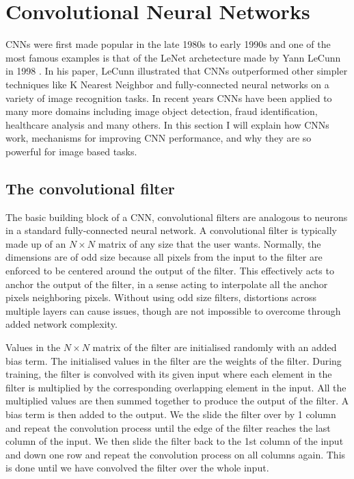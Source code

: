 \section{Convolutional Neural Networks}

\ac{CNN}s were first made popular in the late 1980s to early 1990s 
and one of the most famous examples is that of the LeNet archetecture 
made by Yann LeCunn in 1998 \cite{726791}. In his paper, LeCunn 
illustrated that \ac{CNN}s outperformed other simpler 
techniques like K Nearest Neighbor and fully-connected 
neural networks on a variety of image recognition 
tasks. In recent years \ac{CNN}s have been applied to 
many more domains including image object detection, 
fraud identification, healthcare analysis and many 
others. In this section I will explain how \ac{CNN}s work, 
mechanisms for improving \ac{CNN} performance, and 
why they are so powerful for image based tasks.

\subsection{The convolutional filter}

% 
% 
The basic building block of a \ac{CNN}, convolutional 
filters are analogous to neurons in a standard fully-connected 
neural network. A convolutional filter is typically made up of 
an $N \times N$ matrix of any size that the user wants. Normally, 
the dimensions are of odd size because all pixels from the input 
to the filter are enforced to be centered around the output 
of the filter. This effectively acts to anchor the output 
of the filter, in a sense acting to interpolate all 
the anchor pixels neighboring pixels. Without using odd size filters, distortions 
across multiple layers can cause issues, though are not impossible 
to overcome through added network complexity.

Values in the $N \times N$ matrix of the filter are initialised 
randomly with an added bias term. The initialised values in the 
filter are the weights of the filter. During training, the filter is 
convolved with its given input where each element in the filter 
is multiplied by the corresponding overlapping element in the 
input. All the multiplied values are then summed together to produce 
the output of the filter. A bias term is then added to the 
output. We the slide the filter over by 1 column and repeat 
the convolution process until the edge of the filter reaches 
the last column of the input. We then slide the filter back to 
the 1st column of the input and down one row and repeat 
the convolution process on all columns again. This is done 
until we have convolved the filter over the whole input.

